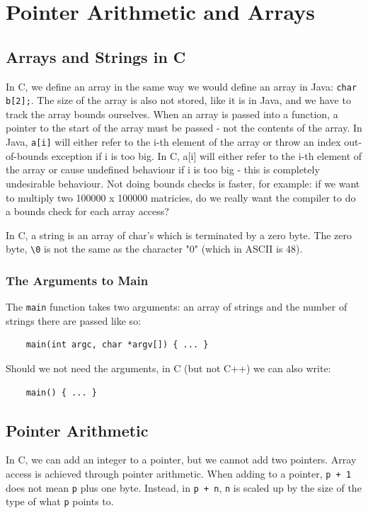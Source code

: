 \documentclass{article}
\begin{document}
	\section{Pointer Arithmetic and Arrays}
	\subsection{Arrays and Strings in C}
	In C, we define an array in the same way we would define an array in Java: \texttt{char b[2];}. The size of the array is also not stored, like it is in Java, and we have to track the array bounds ourselves. When an array is passed into a function, a pointer to the start of the array must be passed - not the contents of the array. In Java, \texttt{a[i]} will either refer to the i-th element of the array or throw an index out-of-bounds exception if i is too big. In C, a[i] will either refer to the i-th element of the array or cause undefined behaviour if i is too big - this is completely undesirable behaviour. Not doing bounds checks is faster, for example: if we want to multiply two 100000 x 100000 matricies, do we really want the compiler to do a bounds check for each array access? 
	\par In C, a string is an array of char's which is terminated by a zero byte. The zero byte, \texttt{\textbackslash 0} is not the same as the character "0" (which in ASCII is 48).
	
	\subsubsection{The Arguments to Main}
	The \texttt{main} function takes two arguments: an array of strings and the number of strings there are passed like so:
	\begin{verbatim}
	main(int argc, char *argv[]) { ... }
	\end{verbatim}
	
	Should we not need the arguments, in C (but not C++) we can also write:
	
	\begin{verbatim}
	main() { ... }	
	\end{verbatim}	
	
	\subsection{Pointer Arithmetic}
	In C, we can add an integer to a pointer, but we cannot add two pointers. Array access is achieved through pointer arithmetic. When adding to a pointer, \texttt{p + 1} does not mean \texttt{p} plus one byte. Instead, in \texttt{p + n}, \texttt{n} is scaled up by the size of the type of what \texttt{p} points to. 
	
\end{document}
